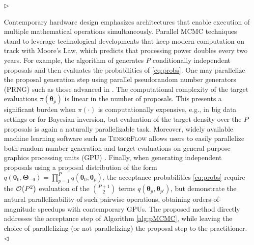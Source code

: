 \documentclass[12pt]{article}
\newenvironment{reply}{$\triangleright$\bfseries}{$\triangleleft$}
\renewenvironment{quote}
               {\list{}{\rightmargin\leftmargin}%
                \item\relax\normalfont}
               {\endlist}
\newcommand{\order}[1]{{\cal O}\hspace{-0.2em}\left( #1 \right)}
\newcommand{\ttheta}{\boldsymbol{\theta}}
\newcommand{\Ttheta}{\boldsymbol{\Theta}}
\begin{document}
\begin{reply}
\begin{quote}
	Contemporary hardware design emphasizes architectures that enable execution of multiple mathematical operations simultaneously. Parallel MCMC techniques stand to leverage technological developments that keep modern computation on track with Moore's Law, which predicts that processing power doubles every two years.  For example, the algorithm of \citet{tjelmeland2004using} generates $P$ conditionally independent proposals and then evaluates the probabilities of \eqref{eq:probs}.  One may parallelize the proposal generation step using parallel pseudorandom number generators (PRNG) such as those advanced in \citet{salmon2011parallel}. The computational complexity of the target evaluations $\pi(\ttheta_p)$ is linear in the number of proposals. This presents a significant burden when $\pi(\cdot)$ is computationally expensive, e.g., in big data settings or for Bayesian inversion, but evaluation of the target density over the $P$ proposals is again a naturally parallelizable task.  Moreover, widely available machine learning software such as \textsc{TensorFlow} allows users to easily parallelize both random number generation and target evaluations on general purpose graphics processing units (GPU) \citep{lao2020tfp}. Finally, when generating independent proposals using a proposal distribution of the form $q(\ttheta_0,\Ttheta_{-0})=\prod_{p=1}^Pq(\ttheta_0,\ttheta_{p})$, the acceptance probabilities \eqref{eq:probs} require the $\order{P^2}$ evaluation of the $P+1\choose 2$ terms $q(\ttheta_{p},\ttheta_{p'})$, but \citet{massive,holbrook2021scalable} demonstrate the natural parallelizability of such pairwise operations, obtaining orders-of-magnitude speedups with contemporary GPUs.  The proposed method directly addresses the acceptance step of Algorithm \ref{alg:pMCMC}, while leaving the choice of parallelizing (or not parallelizing) the proposal step to the practitioner.  
\end{quote}
\end{reply}
\end{document}
